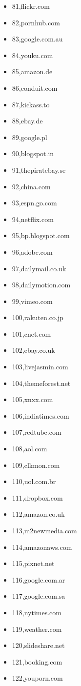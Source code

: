 \begin{multicols}{3}
\begin{itemize}
	\item 81,flickr.com
	\item 82,pornhub.com
	\item 83,google.com.au
	\item 84,youku.com
	\item 85,amazon.de
	\item 86,conduit.com
	\item 87,kickass.to
	\item 88,ebay.de
	\item 89,google.pl
	\item 90,blogspot.in
	\item 91,thepiratebay.se
	\item 92,china.com
	\item 93,espn.go.com
	\item 94,netflix.com
	\item 95,bp.blogspot.com
	\item 96,adobe.com
	\item 97,dailymail.co.uk
	\item 98,dailymotion.com
	\item 99,vimeo.com
	\item 100,rakuten.co.jp
	\item 101,cnet.com
	\item 102,ebay.co.uk
	\item 103,livejasmin.com
	\item 104,themeforest.net
	\item 105,xnxx.com
	\item 106,indiatimes.com
	\item 107,redtube.com
	\item 108,aol.com
	\item 109,clkmon.com
	\item 110,uol.com.br
	\item 111,dropbox.com
	\item 112,amazon.co.uk
	\item 113,m2newmedia.com
	\item 114,amazonaws.com
	\item 115,pixnet.net
	\item 116,google.com.ar
	\item 117,google.com.sa
	\item 118,nytimes.com
	\item 119,weather.com
	\item 120,slideshare.net
	\item 121,booking.com
	\item 122,youporn.com

\end{itemize}
\end{multicols}
